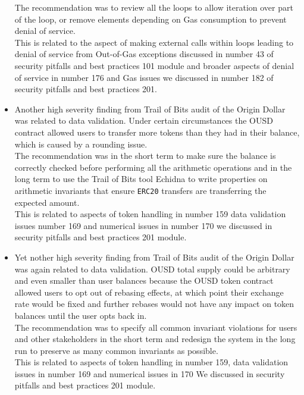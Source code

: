 \begin{itemize}
  The recommendation was to review all the loops to allow iteration over
  part of the loop, or remove elements depending on Gas consumption to
  prevent denial of service.\\

  This is related to the aspect of making external calls within loops
  leading to denial of service from Out-of-Gas exceptions discussed in
  number 43 of security pitfalls and best practices 101 module and
  broader aspects of denial of service in number 176 and Gas issues we
  discussed in number 182 of security pitfalls and best practices 201.
\item
  Another high severity finding from Trail of Bits audit of the Origin
  Dollar was related to data validation. Under certain circumstances the
  OUSD contract allowed users to transfer more tokens than they had in
  their balance, which is caused by a rounding issue.\\

  The recommendation was in the short term to make sure the balance is
  correctly checked before performing all the arithmetic operations and
  in the long term to use the Trail of Bits tool Echidna to write
  properties on arithmetic invariants that ensure \texttt{ERC20}
  transfers are transferring the expected amount.\\

  This is related to aspects of token handling in number 159 data
  validation issues number 169 and numerical issues in number 170 we
  discussed in security pitfalls and best practices 201 module.
\item
  Yet nother high severity finding from Trail of Bits audit of the
  Origin Dollar was again related to data validation. OUSD total supply
  could be arbitrary and even smaller than user balances because the
  OUSD token contract allowed users to opt out of rebasing effects, at
  which point their exchange rate would be fixed and further rebases
  would not have any impact on token balances until the user opts back
  in.\\

  The recommendation was to specify all common invariant violations for
  users and other stakeholders in the short term and redesign the system
  in the long run to preserve as many common invariants as possible.\\

  This is related to aspects of token handling in number 159, data
  validation issues in number 169 and numerical issues in 170 We
  discussed in security pitfalls and best practices 201 module.
\end{itemize}

